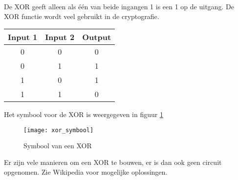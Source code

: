 De XOR geeft alleen als \'e\'en van beide ingangen 1 is een 1 op de uitgang. De XOR functie wordt veel gebruikt in de cryptografie.

\begin{tabular}{ |c|c|c| }
\hline
\rowcolor{gray!60}
	Input 1 & Input 2 & Output \\
	\hline
	0 & 0 & 0 \\
	\hline
	0 & 1 & 1 \\
	\hline
	1 & 0 & 1 \\
	\hline
	1 & 1 & 0 \\
	\hline
\end{tabular}

Het symbool voor de XOR is weergegeven in figuur \ref{symbool:xor}

\begin{figure}[h]
\texttt{[image: xor\_symbool]}
\centering
\caption{Symbool van een XOR}
\label{symbool:xor}
\end{figure}

Er zijn vele manieren om een XOR te bouwen, er is dan ook geen circuit opgenomen. Zie Wikipedia voor mogelijke oplossingen.


